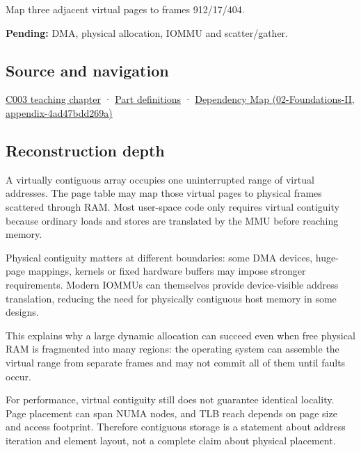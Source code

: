 Map three adjacent virtual pages to frames 912/17/404.

\textbf{Pending:} DMA, physical allocation, IOMMU and scatter/gather.

\subsection{Source and navigation}\label{appendix-f897c1ddac8f-source-and-navigation}

\hyperref[01-foundations-i-ch002-where-the-bytes-live]{C003 teaching chapter} · \hyperref[appendix-fd090d982a15-m003---parts-41-60]{Part definitions} · \href{../02-Foundations-II/main.pdf\#nameddest=appendix-4ad47bdd269a}{Dependency Map (02-Foundations-II, appendix-4ad47bdd269a)}

\subsection{Reconstruction depth}\label{appendix-f897c1ddac8f-reconstruction-depth}

A virtually contiguous array occupies one uninterrupted range of virtual addresses. The page table may map those virtual pages to physical frames scattered through RAM. Most user-space code only requires virtual contiguity because ordinary loads and stores are translated by the MMU before reaching memory.

Physical contiguity matters at different boundaries: some DMA devices, huge-page mappings, kernels or fixed hardware buffers may impose stronger requirements. Modern IOMMUs can themselves provide device-visible address translation, reducing the need for physically contiguous host memory in some designs.

This explains why a large dynamic allocation can succeed even when free physical RAM is fragmented into many regions: the operating system can assemble the virtual range from separate frames and may not commit all of them until faults occur.

For performance, virtual contiguity still does not guarantee identical locality. Page placement can span NUMA nodes, and TLB reach depends on page size and access footprint. Therefore contiguous storage is a statement about address iteration and element layout, not a complete claim about physical placement.
